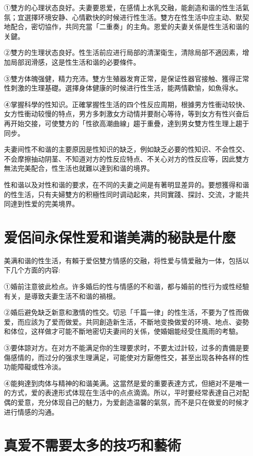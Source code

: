 \documentclass[12pt,UTF8]{ctexbook}
\begin{document}
①雙方的心理状态良好。夫妻要恩爱，在感情上水乳交融，能創造和谐的性生活氣氛；宜選擇环境安静、心情歡快的时候进行性生活。雙方在性生活中应主动、默契地配合，密切協作，共同充當「二重奏」的主角。恩爱的夫妻关係是性生活和谐的关鍵。

②雙方的生理状态良好。性生活前应进行局部的清潔衛生，清除局部不適因素，增加局部润滑感，这是性生活和谐的必要條件。

③雙方体魄强健，精力充沛。雙方生殖器发育正常，是保证性器官接触、獲得正常性刺激的生理基礎。選擇身体健康的时候进行性生活，能两情歡愉，如魚得水。

④掌握科學的性知识。正確掌握性生活的四个性反应周期，根據男方性衝动较快、女方性衝动较慢的特点，男方多刺激女方动情并要耐心等待，等到女方有性兴奋后再开始交接，可使雙方的「性欲高潮曲線」趨于重疊，達到男女雙方性生理上趨于同步。

夫妻间性不和谐的主要原因是性知识的缺乏，例如缺乏必要的性知识、不会性交、不会摩擦抽动阴茎、不知道对方的性反应特点、不关心对方的性反应等，因此雙方無法完美配合，性生活也就難以達到和谐的境界。

性和谐以及对性和谐的要求，在不同的夫妻之间是有著明显差异的。要想獲得和谐的性生活，只有夫婦雙方的积極性同时调动起來，共同實踐、探討、交流，才能共同達到性爱的完美境界。

\section{爱侶间永保性爱和谐美满的秘訣是什麼}

美满和谐的性生活，有賴于爱侶雙方情感的交融，将性爱与情爱融为一体，包括以下几个方面的内容:

①婚前注意彼此检点。许多婚后的性与情感的不和谐，都与婚前的性行为或性经驗有关，是導致夫妻生活不和谐的禍根。

②婚后避免缺乏新意和激情的性交。切忌「千篇一律」的性生活，不要为了性而做爱，而应該为了爱而做爱。共同創造新生活，不斷地变換做爱的环境、地点、姿勢和体位，这样做才可能不斷地密切夫妻间的关係，使婚姻能经受住風雨的考驗。

③要体諒对方。在对方不能满足你的生理要求时，不要太过計较，过多的責備是要傷感情的，而过分的强求生理满足，可能使对方厭倦性交，甚至出现各种各样的性功能障礙或性冷淡。

④能夠達到肉体与精神的和谐美满。这當然是爱的重要表達方式，但絕对不是唯一的方式，爱的表達形式体现在生活中的点点滴滴。所以，平时要经常表達自己对配偶的爱意，充分体现自己的魅力，为爱創造温馨的氣氛，而不是只在做爱的时候才进行情感的沟通。

\section{真爱不需要太多的技巧和藝術}
\end{document}
